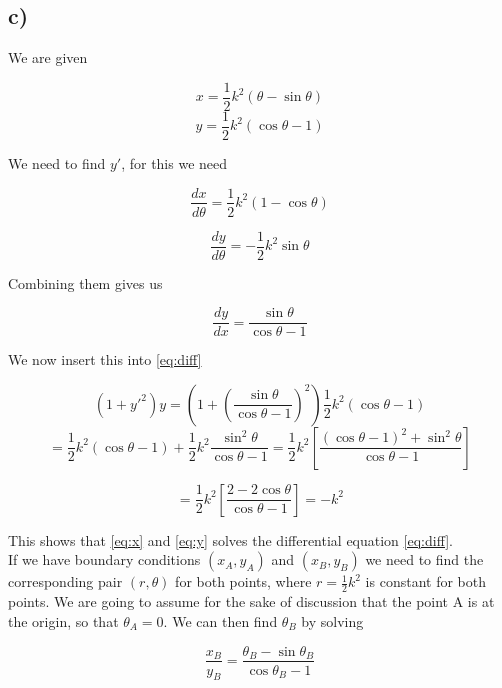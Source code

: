 \documentclass[a4paper,norsk, 10pt]{article}
\begin{document}
\subsection*{c)}

We are given 

\begin{equation}
x = \frac{1}{2}k^2(\theta - \sin\theta)
\label{eq:x}
\end{equation}
\begin{equation}
y = \frac{1}{2}k^2(\cos\theta - 1)
\label{eq:y}
\end{equation}

We need to find $y'$, for this we need

\begin{equation}
\frac{dx}{d\theta} = \frac{1}{2}k^2(1-\cos\theta)
\label{eq:dxdt}
\end{equation}

\begin{equation}
\frac{dy}{d\theta} = -\frac{1}{2}k^2\sin\theta
\label{eq:dydt}
\end{equation}

Combining them gives us

\begin{equation}
\frac{dy}{dx} = \frac{\sin\theta}{\cos\theta - 1}
\label{eq:dydx}
\end{equation}

We now insert this into \ref{eq:diff}

$$
(1+y'^2)y = (1+\left(\frac{\sin\theta}{\cos\theta - 1}\right)^2)\frac{1}{2}k^2(\cos\theta - 1)
$$
$$
= \frac{1}{2}k^2(\cos\theta -1) + \frac{1}{2}k^2\frac{\sin^2\theta}{\cos\theta - 1} = \frac{1}{2}k^2\left[\frac{(\cos\theta -1)^2 + \sin^2\theta}{\cos\theta - 1}\right]
$$

$$
= \frac{1}{2}k^2\left[\frac{2 - 2\cos\theta}{\cos\theta - 1}\right] = -k^2
$$

This shows that \ref{eq:x} and \ref{eq:y} solves the differential equation \ref{eq:diff}.\\

If we have boundary conditions $(x_A,y_A)$ and $(x_B,y_B)$ we need to find the corresponding pair $(r,\theta)$ for both points, where $r = \frac{1}{2}k^2$ is constant for both points. We are going to assume for the sake of discussion that the point A is at the origin, so that $\theta_A = 0$. We can then find $\theta_B$ by solving

$$
\frac{x_B}{y_B} = \frac{\theta_B - \sin\theta_B}{\cos\theta_B - 1}
$$
\end{document}
